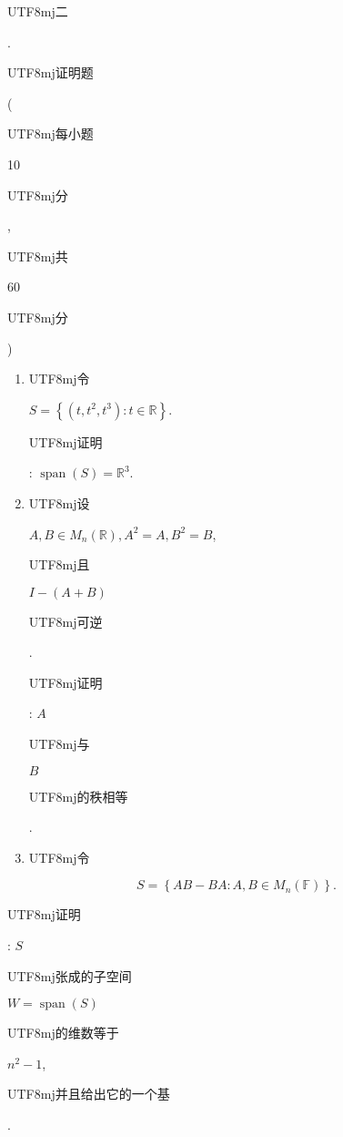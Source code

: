 \documentclass[10pt]{article}
\begin{document}
\begin{CJK}{UTF8}{mj}二\end{CJK}. \begin{CJK}{UTF8}{mj}证明题\end{CJK} (\begin{CJK}{UTF8}{mj}每小题\end{CJK} 10 \begin{CJK}{UTF8}{mj}分\end{CJK}, \begin{CJK}{UTF8}{mj}共\end{CJK} 60 \begin{CJK}{UTF8}{mj}分\end{CJK})

\begin{enumerate}
  \item \begin{CJK}{UTF8}{mj}令\end{CJK} $S=\left\{\left(t, t^{2}, t^{3}\right): t \in \mathbb{R}\right\}$. \begin{CJK}{UTF8}{mj}证明\end{CJK}: $\operatorname{span}(S)=\mathbb{R}^{3}$.

  \item \begin{CJK}{UTF8}{mj}设\end{CJK} $A, B \in M_{n}(\mathbb{R}), A^{2}=A, B^{2}=B$, \begin{CJK}{UTF8}{mj}且\end{CJK} $I-(A+B)$ \begin{CJK}{UTF8}{mj}可逆\end{CJK}. \begin{CJK}{UTF8}{mj}证明\end{CJK}: $A$ \begin{CJK}{UTF8}{mj}与\end{CJK} $B$ \begin{CJK}{UTF8}{mj}的秩相等\end{CJK}.

  \item \begin{CJK}{UTF8}{mj}令\end{CJK}

\end{enumerate}
$$
S=\left\{A B-B A: A, B \in M_{n}(\mathbb{F})\right\} .
$$
\begin{CJK}{UTF8}{mj}证明\end{CJK}: $S$ \begin{CJK}{UTF8}{mj}张成的子空间\end{CJK} $W=\operatorname{span}(S)$ \begin{CJK}{UTF8}{mj}的维数等于\end{CJK} $n^{2}-1$, \begin{CJK}{UTF8}{mj}并且给出它的一个基\end{CJK}.
\end{document}
